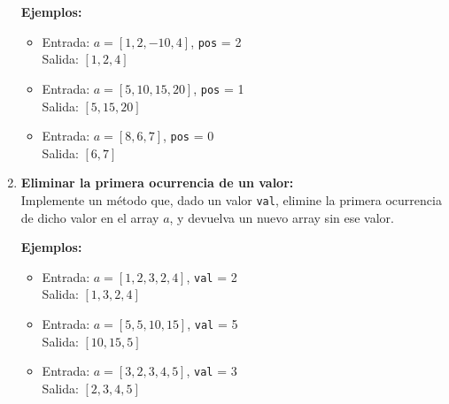 \begin{enumerate}[label=\alph*)]
    \textbf{Ejemplos:}
    \begin{itemize}
        \item Entrada: \(a = [1, 2, -10, 4]\), \texttt{pos} = 2 \\
        Salida: \([1, 2, 4]\)
        \item Entrada: \(a = [5, 10, 15, 20]\), \texttt{pos} = 1 \\
        Salida: \([5, 15, 20]\)
        \item Entrada: \(a = [8, 6, 7]\), \texttt{pos} = 0 \\
        Salida: \([6, 7]\)
    \end{itemize}

    \item \textbf{Eliminar la primera ocurrencia de un valor:} \\
    Implemente un método que, dado un valor \texttt{val}, elimine la primera ocurrencia de dicho valor en el array \(a\), y devuelva un nuevo array sin ese valor.
    
    \textbf{Ejemplos:}
    \begin{itemize}
        \item Entrada: \(a = [1, 2, 3, 2, 4]\), \texttt{val} = 2 \\
        Salida: \([1, 3, 2, 4]\)
        \item Entrada: \(a = [5, 5, 10, 15]\), \texttt{val} = 5 \\
        Salida: \([10, 15, 5]\)
        \item Entrada: \(a = [3, 2, 3, 4, 5]\), \texttt{val} = 3 \\
        Salida: \([2, 3, 4, 5]\)
    \end{itemize}
\end{enumerate}
